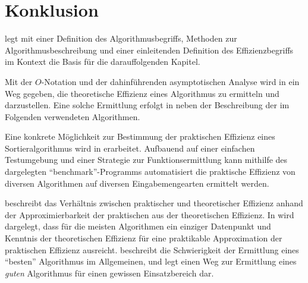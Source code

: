 \chapter*{Konklusion}

 legt mit einer Definition des Algorithmusbegriffs, Methoden zur Algorithmusbeschreibung und einer einleitenden Definition des Effizienzbegriffs im Kontext die Basis für die darauffolgenden Kapitel.

Mit der $O$-Notation und der dahinführenden asymptotischen Analyse wird in  ein Weg gegeben, die theoretische Effizienz eines Algorithmus zu ermitteln und darzustellen. Eine solche Ermittlung erfolgt in  neben der Beschreibung der im Folgenden verwendeten Algorithmen.

Eine konkrete Möglichkeit zur Bestimmung der praktischen Effizienz eines Sortieralgorithmus wird in  erarbeitet. Aufbauend auf einer einfachen Testumgebung und einer Strategie zur Funktionsermittlung kann mithilfe des dargelegten \enquote{benchmark}-Programms automatisiert die praktische Effizienz von diversen Algorithmen auf diversen Eingabemengearten ermittelt werden.

 beschreibt das Verhältnis zwischen praktischer und theoretischer Effizienz anhand der Approximierbarkeit der praktischen aus der theoretischen Effizienz. In  wird dargelegt, dass für die meisten Algorithmen ein einziger Datenpunkt und Kenntnis der theoretischen Effizienz für eine praktikable Approximation der praktischen Effizienz ausreicht.  beschreibt die Schwierigkeit der Ermittlung eines \enquote{besten} Algorithmus im Allgemeinen, und legt einen Weg zur Ermittlung eines \emph{guten} Algorithmus für einen gewissen Einsatzbereich dar.

